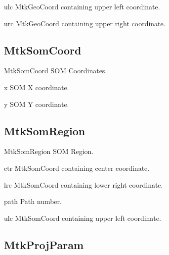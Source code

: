 \documentclass{howto}
\begin{document}
\begin{memberdesc}[MtkGeoCoord]{ulc}
  MtkGeoCoord containing upper left coordinate.
\end{memberdesc}

\begin{memberdesc}[MtkGeoCoord]{urc}
  MtkGeoCoord containing upper right coordinate.
\end{memberdesc}


\subsection{MtkSomCoord \label{mtksomcoord}}

\begin{classdesc*}{MtkSomCoord}
  SOM Coordinates.
\end{classdesc*}

\begin{memberdesc}[float]{x}
  SOM X coordinate.
\end{memberdesc}

\begin{memberdesc}[float]{y}
  SOM Y coordinate.
\end{memberdesc}

\subsection{MtkSomRegion \label{mtksomregion}}

\begin{classdesc*}{MtkSomRegion}
  SOM Region.
\end{classdesc*}

\begin{memberdesc}[MtkSomCoord]{ctr}
  MtkSomCoord containing center coordinate.
\end{memberdesc}

\begin{memberdesc}[MtkSomCoord]{lrc}
  MtkSomCoord containing lower right coordinate.
\end{memberdesc}

\begin{memberdesc}[int]{path}
  Path number.
\end{memberdesc}

\begin{memberdesc}[MtkSomCoord]{ulc}
  MtkSomCoord containing upper left coordinate.
\end{memberdesc}

\subsection{MtkProjParam \label{mtkprojparam}}
\end{document}
